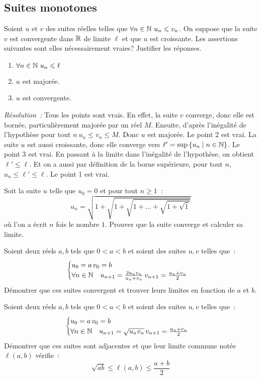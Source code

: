 \subsection{Suites monotones}
\begin{exercice}
    Soient \(u\) et \(v\) des suites réelles telles que \(\forall n \in \mathbb{N} \ u_n \leqslant v_n\). On suppose que la suite \(v\) est convergente dans \(\mathbb{R}\) de limite \(\ell\) et que \(u\) est croissante. Les assertions suivantes sont elles nécessairement vraies? Justifier les réponses.
    \begin{enumerate}
        \item \(\forall n \in \mathbb{N} \ u_n \leqslant \ell\)
        \item \(u\) est majorée.
        \item \(u\) est convergente.
    \end{enumerate}    
\end{exercice}
\emph{Résolution~:} Tous les points sont vrais. En effet, la suite \(v\) converge, donc elle est bornée, particulièrement majorée par un réel \(M\). Ensuite, d'après l'inégalité de l'hypothèse pour tout \(n \ u_n \leqslant v_n \leqslant M\). Donc \(u\) est majorée. Le point 2 est vrai. La suite \(u\) est aussi croissante, donc elle converge vers \(\ell' = \sup\left\{u_n\mathrel{}\middle|\mathrel{}n\in \mathbb{N}\right\}\). Le point 3 est vrai. En passant à la limite dans l'inégalité de l'hypothèse, on obtient \(\ell' \leqslant \ell\). Et on a aussi par définition de la borne supérieure, pour tout \(n\), \(u_n \leqslant \ell' \leqslant \ell\). Le point 1 est vrai.
\begin{exercice}
    Soit la suite \(u\) telle que \(u_0 = 0\) et pour tout \(n \geqslant 1\)~:
    \[ u_n = \sqrt{1 + \sqrt{ 1 + \sqrt{ 1 + \ldots +\sqrt{1 + \sqrt{1}}}}} \]
    où l'on a écrit \(n\) fois le nombre \(1\). Prouver que la suite converge et calculer sa limite.
\end{exercice}
\begin{exercice}
    Soient deux réels \(a, b\) tels que \(0 < a < b\) et soient des suites \(u, v\) telles que~:
    \[ \begin{cases} u_0 = a \, v_0 = b \\ \forall n \in \mathbb{N} \quad u_{n+1} = \frac{2 u_n v_n}{u_n + v_n} \, v_{n+1} = \frac{u_n+v_n}{2} \end{cases}\]
    Démontrer que ces suites convergent et trouver leurs limites en fonction de \(a\) et \(b\).
\end{exercice}
\begin{exercice}
    Soient deux réels \(a, b\) tels que \(0 < a < b \) et soient des suites \(u, v\) telles que~:
    \[ \begin{cases} u_0 = a \, v_0 = b \\ \forall n \in \mathbb{N} \quad u_{n+1} = \sqrt{u_n v_n} \, v_{n+1} = \frac{u_n+v_n}{2} \end{cases}\]
    Démontrer que ces suites sont adjacentes et que leur limite commune notée \(\ell(a,b)\) vérifie~:
    \[ \sqrt{ab} \leqslant \ell(a,b) \leqslant \frac{a+b}{2}\]
\end{exercice}
